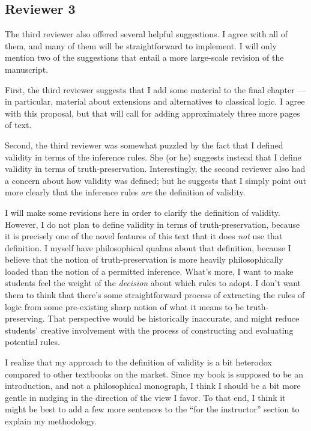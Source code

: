 \documentclass[12pt]{article}
\begin{document}
  \subsection*{Reviewer 3}

  The third reviewer also offered several helpful suggestions.  I
  agree with all of them, and many of them will be straightforward to
  implement.  I will only mention two of the suggestions that entail a
  more large-scale revision of the manuscript.

  First, the third reviewer suggests that I add some material to the
  final chapter --- in particular, material about extensions and
  alternatives to classical logic.  I agree with this proposal, but
  that will call for adding approximately three more pages of text.
 
  Second, the third reviewer was somewhat puzzled by the fact that I
  defined validity in terms of the inference rules.  She (or he)
  suggests instead that I define validity in terms of
  truth-preservation.  Interestingly, the second reviewer also had a
  concern about how validity was defined; but he suggests that I
  simply point out more clearly that the inference rules \emph{are}
  the definition of validity.

  I will make some revisions here in order to clarify the definition
  of validity.  However, I do not plan to define validity in terms of
  truth-preservation, because it is precisely one of the novel
  features of this text that it does \emph{not} use that definition.
  I myself have philosophical qualms about that definition, because I
  believe that the notion of truth-preservation is more heavily
  philosophically loaded than the notion of a permitted inference.
  What's more, I want to make students feel the weight of the
  \emph{decision} about which rules to adopt.  I don't want them to
  think that there's some straightforward process of extracting the
  rules of logic from some pre-existing sharp notion of what it means
  to be truth-preserving.  That perspective would be historically
  inaccurate, and might reduce students' creative involvement with the
  process of constructing and evaluating potential rules.

  I realize that my approach to the definition of validity is a bit
  heterodox compared to other textbooks on the market.  Since my book
  is supposed to be an introduction, and not a philosophical
  monograph, I think I should be a bit more gentle in nudging in the
  direction of the view I favor.  To that end, I think it might be
  best to add a few more sentences to the ``for the instructor''
  section to explain my methodology.
  
\end{document}

